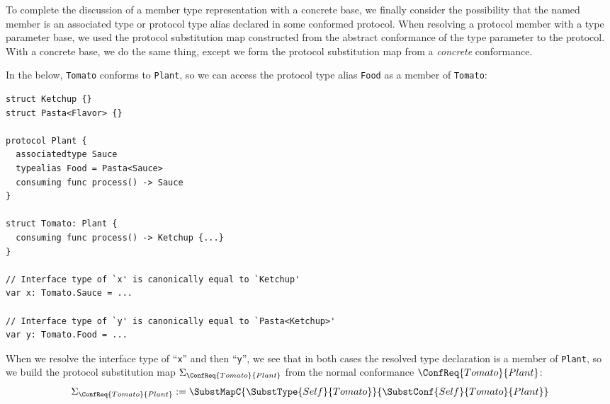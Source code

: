\documentclass[../generics]{subfiles}
\begin{document}
\smallskip

To complete the discussion of a member type representation with a concrete base, we finally consider the possibility that the named member is an associated type or protocol type alias declared in some conformed protocol. When resolving a protocol member with a type parameter base, we used the protocol substitution map constructed from the abstract conformance of the type parameter to the protocol. With a concrete base, we do the same thing, except we form the protocol substitution map from a \emph{concrete} conformance.

In the below, \texttt{Tomato} conforms to \texttt{Plant}, so we can access the protocol type alias \texttt{Food} as a member of \texttt{Tomato}:
\begin{Verbatim}
struct Ketchup {}
struct Pasta<Flavor> {}

protocol Plant {
  associatedtype Sauce
  typealias Food = Pasta<Sauce>
  consuming func process() -> Sauce
}

struct Tomato: Plant {
  consuming func process() -> Ketchup {...}
}

// Interface type of `x' is canonically equal to `Ketchup'
var x: Tomato.Sauce = ...

// Interface type of `y' is canonically equal to `Pasta<Ketchup>'
var y: Tomato.Food = ...
\end{Verbatim}
When we resolve the interface type of ``\texttt{x}'' and then ``\texttt{y}'', we see that in both cases the resolved type declaration is a member of \texttt{Plant}, so we build the protocol substitution map $\Sigma_{\ConfReq{Tomato}{Plant}}$ from the normal conformance $\ConfReq{Tomato}{Plant}$:
\[\Sigma_{\ConfReq{Tomato}{Plant}} := \SubstMapC{\SubstType{Self}{Tomato}}{\SubstConf{Self}{Tomato}{Plant}}\]
\end{document}
